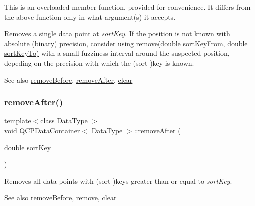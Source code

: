 This is an overloaded member function, provided for convenience. It differs from the above function only in what argument(s) it accepts.

Removes a single data point at {\itshape sort\+Key}. If the position is not known with absolute (binary) precision, consider using \hyperlink{class_q_c_p_data_container_ae5f569a120648b167efa78835f12fd38}{remove(double sort\+Key\+From, double sort\+Key\+To)} with a small fuzziness interval around the suspected position, depeding on the precision with which the (sort-\/)key is known.

\begin{DoxySeeAlso}{See also}
\hyperlink{class_q_c_p_data_container_aa7f74cbce304b0369e1626c3798e1eda}{remove\+Before}, \hyperlink{class_q_c_p_data_container_abbe5d87ffc10b5aeffa5bb42cf03aa3c}{remove\+After}, \hyperlink{class_q_c_p_data_container_a7e2b29736c6fd761649bda1a54ba967f}{clear} 
\end{DoxySeeAlso}
\mbox{\label{class_q_c_p_data_container_abbe5d87ffc10b5aeffa5bb42cf03aa3c}} 
\subsubsection{\texorpdfstring{remove\+After()}{removeAfter()}}
{\footnotesize\ttfamily template$<$class Data\+Type $>$ \\
void \hyperlink{class_q_c_p_data_container}{Q\+C\+P\+Data\+Container}$<$ Data\+Type $>$\+::remove\+After (\begin{DoxyParamCaption}\item[{double}]{sort\+Key }\end{DoxyParamCaption})}

Removes all data points with (sort-\/)keys greater than or equal to {\itshape sort\+Key}.

\begin{DoxySeeAlso}{See also}
\hyperlink{class_q_c_p_data_container_aa7f74cbce304b0369e1626c3798e1eda}{remove\+Before}, \hyperlink{class_q_c_p_data_container_ae5f569a120648b167efa78835f12fd38}{remove}, \hyperlink{class_q_c_p_data_container_a7e2b29736c6fd761649bda1a54ba967f}{clear} 
\end{DoxySeeAlso}
\mbox{\label{class_q_c_p_data_container_aa7f74cbce304b0369e1626c3798e1eda}} 
